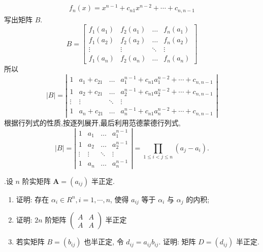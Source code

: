 \documentclass{article}
\begin{document}
\begin{enumerate}[\qquad 解：]
$$\begin{array}{c}
                  f_{n}(x)=x^{n-1}+c_{n 1} x^{n-2}+\cdots+c_{n, n-1}
              \end{array}
          $$
          写出矩阵 $B$.
          $$
              B=\left[\begin{array}{cccc}
                      f_{1}\left(a_{1}\right) & f_{2}\left(a_{1}\right) & \ldots & f_{n}\left(a_{1}\right) \\
                      f_{1}\left(a_{2}\right) & f_{2}\left(a_{2}\right) & \ldots & f_{n}\left(a_{2}\right) \\
                      \vdots                  & \vdots                  & \ddots & \vdots                  \\
                      f_{1}\left(a_{n}\right) & f_{2}\left(a_{n}\right) & \ldots & f_{n}\left(a_{n}\right)
                  \end{array}\right]
          $$
          所以
          $$
              |B|=\left|\begin{array}{lllc}
                  1      & a_{1}+c_{21} & \ldots & a_{1}^{n-1}+c_{n 1} a_{1}^{n-2}+\cdots+c_{n, n-1} \\
                  1      & a_{2}+c_{21} & \ldots & a_{2}^{n-1}+c_{n 1} a_{2}^{n-2}+\cdots+c_{n, n-1} \\
                  \vdots & \vdots       & \ddots & \vdots                                            \\
                  1      & a_{n}+c_{21} & \ldots & a_{n}^{n-1}+c_{n 1} a_{n}^{n-2}+\cdots+c_{n, n-1}
              \end{array}\right|
          $$
          根据行列式的性质,按逐列展开,最后利用范德蒙德行列式,
          $$
              |B|=\left|\begin{array}{cccc}
                  1      & a_{1}  & \ldots & a_{1}^{n-1} \\
                  1      & a_{2}  & \ldots & a_{2}^{n-1} \\
                  \vdots & \vdots & \ddots & \vdots      \\
                  1      & a_{n}  & \ldots & a_{n}^{n-1}
              \end{array}\right|=\prod_{1 \leq i<j \leq n}\left(a_{j}-a_{i}\right) .
          $$
\end{enumerate}

\vspace{1ex}
{.}设 $n$ 阶实矩阵 $\boldsymbol{A}=\left(a_{i j}\right)$ 半正定.
\begin{enumerate}[\qquad (1)]
    \item 证明: 存在 $\alpha_{i} \in R^{n}, i=1, \cdots, n$, 使得 $a_{i j}$ 等于 $\alpha_{i}$ 与 $\alpha_{j}$ 的内积;
    \item 证明: $2 n$ 阶矩阵 $\left(\begin{array}{cc}A & A \\ A & A\end{array}\right)$ 半正定
    \item 若实矩阵 $B=\left(b_{i j}\right)$ 也半正定, 令 $d_{i j}=a_{i j} b_{i j} .$ 证明: 矩阵 $D=\left(d_{i j}\right)$ 半正定.
\end{enumerate}
\end{document}
